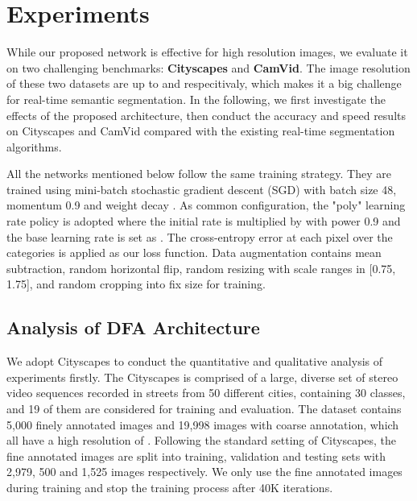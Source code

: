 \documentclass[10pt,twocolumn,letterpaper]{article}
\begin{document}
\section{Experiments}
While our proposed network is effective for high resolution images, we evaluate it on two challenging benchmarks: \textbf{Cityscapes} and \textbf{CamVid}. The image resolution of these two datasets are up to  and  respecitivaly, which makes it a big challenge for real-time semantic segmentation. In the following, we first investigate the effects of the proposed architecture, then conduct the accuracy and speed results on Cityscapes and CamVid compared with the existing real-time segmentation algorithms. 

All the networks mentioned below follow the same training strategy. They are trained using mini-batch stochastic gradient descent (SGD) with batch size 48, momentum 0.9 and weight decay . As common configuration, the "poly" learning rate policy is adopted where the initial rate is multiplied by  with power 0.9 and the base learning rate is set as . The cross-entropy error at each pixel over the categories is applied as our loss function. Data augmentation contains mean subtraction, random horizontal flip, random resizing with scale ranges in [0.75, 1.75], and random cropping into fix size for training.

\subsection{Analysis of DFA Architecture}

We adopt Cityscapes to conduct the quantitative and qualitative analysis of experiments firstly. The Cityscapes is comprised of a large, diverse set of stereo video sequences recorded in streets from 50 different cities, containing 30 classes, and 19 of them are considered for training and evaluation. The dataset contains 5,000 finely annotated images and 19,998 images with coarse annotation, which all have a high resolution of . Following the standard setting of Cityscapes, the fine annotated images are split into training, validation and testing sets with 2,979, 500 and 1,525 images respectively. We only use the fine annotated images during training and stop the training process after 40K iterations. 
\end{document}
